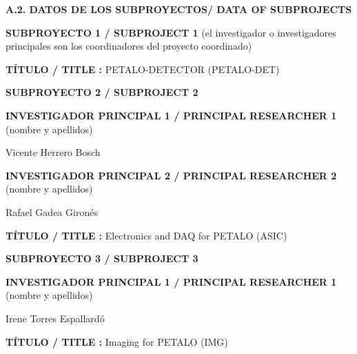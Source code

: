 \documentclass[a4paper,11pt,oneside]{article}
\begin{document}
 \vspace{12pt}


\noindent\textbf{A.2. DATOS DE LOS SUBPROYECTOS/ DATA OF SUBPROJECTS }
 \vspace{12pt}
 
\noindent\textbf{SUBPROYECTO 1 / SUBPROJECT 1} (el investigador o investigadores principales son los coordinadores del proyecto coordinado)

\vspace{6pt}
\noindent\textbf{TÍTULO / TITLE :} PETALO-DETECTOR (PETALO-DET)

 \vspace{12pt}
 
\noindent\textbf{SUBPROYECTO 2 / SUBPROJECT 2}
\vspace{6pt}

\noindent\textbf{INVESTIGADOR PRINCIPAL 1 / PRINCIPAL RESEARCHER 1 } (nombre y apellidos)

\vspace{6pt}
\noindent Vicente Herrero Bosch

\vspace{12pt}
\noindent\textbf{INVESTIGADOR PRINCIPAL 2 / PRINCIPAL RESEARCHER 2} (nombre y apellidos)

\vspace{6pt}
Rafael Gadea Gironés


\vspace{6pt}
\noindent\textbf{TÍTULO / TITLE :} Electronics and DAQ for PETALO (ASIC)

\vspace{12pt}
\noindent\textbf{SUBPROYECTO 3 / SUBPROJECT 3}
\vspace{6pt}

\noindent\textbf{INVESTIGADOR PRINCIPAL 1 / PRINCIPAL RESEARCHER 1 } (nombre y apellidos)

\vspace{6pt}
\noindent Irene Torres Espallardó

\vspace{6pt}
\noindent\textbf{TÍTULO / TITLE :} Imaging for PETALO (IMG)



\newpage
\setcounter{page}{1}
\end{document}
